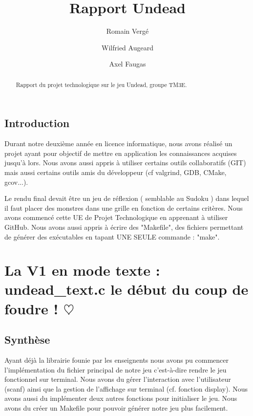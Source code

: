\documentclass[12pt]{report}
\title{Rapport Undead}
\author[ ]{Romain Vergé}
\author[ ]{Wilfried Augeard}
\author[ ]{Axel Faugas}
\affil[ ]{}
\begin{document}
\maketitle

\begin{abstract}
Rapport du projet technologique sur le jeu Undead, groupe TM3E.
\end{abstract}

\tableofcontents



\section{Introduction}
\begin{normalsize}
Durant notre deuxième année en licence informatique, nous avons réalisé un projet ayant pour objectif de mettre en application les connaissances acquises jusqu'à lors. Nous avons aussi appris à utiliser certains outils collaboratifs (GIT) mais aussi certains outils amis du développeur (cf valgrind, GDB, CMake, gcov...).

Le rendu final devait être un jeu de réflexion ( semblable au Sudoku ) dans lequel il faut placer des monstres dans une grille en fonction de certains critères.
Nous avons commencé cette UE de Projet Technologique en apprenant à utiliser GitHub. Nous avons aussi appris à écrire des "Makefile", des fichiers permettant de générer des exécutables en tapant UNE SEULE commande : "make".
\end{normalsize}


\chapter{La V1 en mode texte : undead\_text.c le début du coup de foudre ! $\heartsuit$}

\section{Synthèse}
\begin{normalsize}
Ayant déjà la librairie founie par les enseignents nous avons pu commencer l'implémentation du fichier principal de notre jeu c'est-à-dire rendre le jeu fonctionnel sur terminal. Nous avons du gérer l'interaction avec l'utilisateur (scanf) ainsi que la gestion de l'affichage sur terminal (cf. fonction display). Nous avons aussi du implémenter deux autres fonctions pour initialiser le jeu. Nous avons du créer un Makefile pour pouvoir générer notre jeu plus facilement.  
\end{normalsize}
\end{document}
